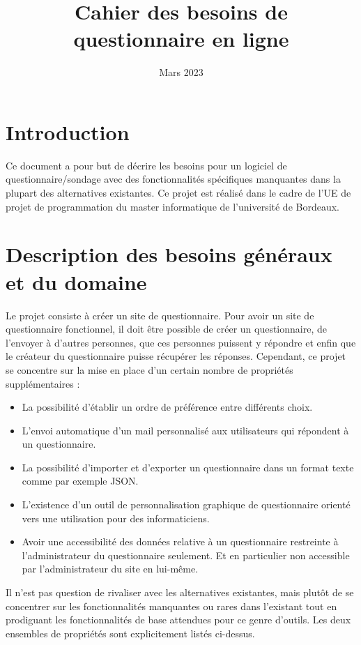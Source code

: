 \documentclass{article}
\title{Cahier des besoins de questionnaire en ligne}
\author{}
\date{Mars 2023}
\begin{document}
\maketitle

\section{Introduction}
Ce document a pour but de décrire les besoins pour un logiciel de questionnaire/sondage avec des fonctionnalités spécifiques manquantes dans la plupart des alternatives existantes. Ce projet est réalisé dans le cadre de l'UE de projet de programmation du master informatique de l'université de Bordeaux.

\section{Description des besoins généraux et du domaine}
Le projet consiste à créer un site de questionnaire. Pour avoir un site de questionnaire fonctionnel, il doit être possible de créer un questionnaire, de l'envoyer à d'autres personnes, que ces personnes puissent y répondre et enfin que le créateur du questionnaire puisse récupérer les réponses. Cependant, ce projet se concentre sur la mise en place d'un certain nombre de propriétés supplémentaires :
\begin{itemize}[noitemsep]
\item La possibilité d'établir un ordre de préférence entre différents choix.
\item L'envoi automatique d'un mail personnalisé aux utilisateurs qui répondent à un questionnaire.
\item La possibilité d'importer et d'exporter un questionnaire dans un format texte comme par exemple JSON.
\item L'existence d'un outil de personnalisation graphique de questionnaire orienté vers une utilisation pour des informaticiens.
\item Avoir une accessibilité des données relative à un questionnaire restreinte à l'administrateur du questionnaire seulement. Et en particulier non accessible par l'administrateur du site en lui-même.
\end{itemize}
Il n'est pas question de rivaliser avec les alternatives existantes, mais plutôt de se concentrer sur les fonctionnalités manquantes ou rares dans l'existant tout en prodiguant les fonctionnalités de base attendues pour ce genre d'outils. Les deux ensembles de propriétés sont explicitement listés ci-dessus.
\end{document}
